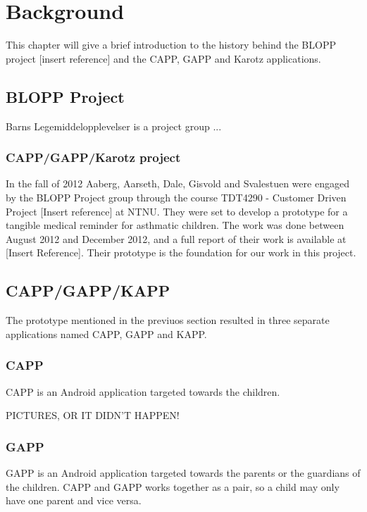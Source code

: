 \chapter{Background}
\label{background}


This chapter will give a brief introduction to the history behind the BLOPP project [insert reference] and the CAPP, GAPP and Karotz applications.


\section{BLOPP Project}
\label{bloppproject}
Barns Legemiddelopplevelser is a project group ...

\subsection{CAPP/GAPP/Karotz project}
In the fall of 2012 Aaberg, Aarseth, Dale, Gisvold and Svalestuen were engaged by the BLOPP Project group through the course TDT4290 - Customer Driven Project [Insert reference] at NTNU. They were set to develop a prototype for a tangible medical reminder for asthmatic children. The work was done between August 2012 and December 2012, and a full report of their work is available at [Insert Reference]. 
Their prototype is the foundation for our work in this project.


\section{CAPP/GAPP/KAPP}
\label{cappgappkapp}
The prototype mentioned in the previuos section resulted in three separate applications named CAPP, GAPP and KAPP. 

\subsection{CAPP}
CAPP is an Android application targeted towards the children.  

PICTURES, OR IT DIDN'T HAPPEN!

\subsection{GAPP}
GAPP is an Android application targeted towards the parents or the guardians of the children. CAPP and GAPP works together as a pair, so a child may only have one parent and vice versa.


